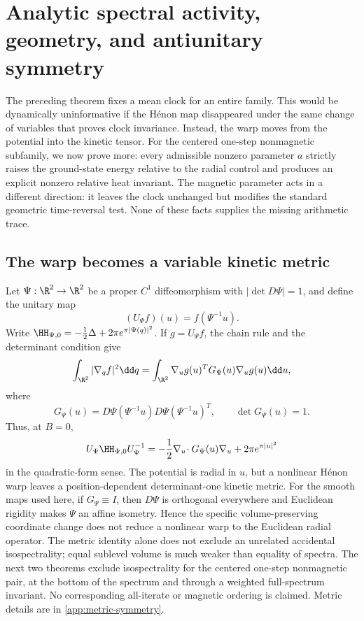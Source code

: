 \section{Analytic spectral activity, geometry, and antiunitary symmetry}
\label{sec:active}

The preceding theorem fixes a mean clock for an entire family.  This would
be dynamically uninformative if the H\'enon map disappeared under the same
change of variables that proves clock invariance.  Instead, the warp moves
from the potential into the kinetic tensor.  For the centered one-step
nonmagnetic subfamily, we now prove more: every admissible nonzero parameter
\(a\) strictly raises the ground-state energy relative to the radial control
and produces an explicit nonzero relative heat invariant.  The
magnetic parameter acts in a different direction: it leaves the clock
unchanged but modifies the standard geometric time-reversal test.  None of
these facts supplies the missing arithmetic trace.

\subsection{The warp becomes a variable kinetic metric}

Let \(\Psi:\R^2\to\R^2\) be a proper \(C^1\) diffeomorphism with
\(|\det D\Psi|=1\), and define the unitary map
\begin{equation}
 (U_\Psi f)(u)=f(\Psi^{-1}u).
 \label{eq:configuration-unitary}
\end{equation}
Write
\(\HH_{\Psi,0}=-\frac12\Delta+2\pi e^{\pi|\Psi(q)|^2}\).
If \(g=U_\Psi f\), the chain rule and the determinant condition give
\begin{equation}
 \int_{\R^2}|\nabla_q f|^2\dd q
 =\int_{\R^2}\nabla_u g(u)^T G_\Psi(u)\nabla_u g(u)\dd u,
 \label{eq:metric-form}
\end{equation}
where
\begin{equation}
 G_\Psi(u)
 =D\Psi(\Psi^{-1}u)D\Psi(\Psi^{-1}u)^T,
 \qquad \det G_\Psi(u)=1.
 \label{eq:metric-tensor}
\end{equation}
Thus, at \(B=0\),
\begin{equation}
 U_\Psi\HH_{\Psi,0}U_\Psi^{-1}
 =-\frac12\nabla_u\!\cdot G_\Psi(u)\nabla_u
  +2\pi e^{\pi|u|^2}
 \label{eq:unitary-metric}
\end{equation}
in the quadratic-form sense.  The potential is radial in \(u\), but a
nonlinear H\'enon warp leaves a position-dependent determinant-one kinetic
metric.  For the smooth maps used here, if \(G_\Psi\equiv I\), then
\(D\Psi\) is orthogonal everywhere and Euclidean rigidity makes \(\Psi\) an
affine isometry.  Hence the
specific volume-preserving coordinate change does not reduce a nonlinear
warp to the Euclidean radial operator.  The metric identity alone does not
exclude an unrelated accidental isospectrality; equal sublevel volume is
much weaker than equality of spectra.  The next two theorems exclude
isospectrality for the centered one-step nonmagnetic pair, at the bottom of
the spectrum and through a weighted full-spectrum invariant.  No
corresponding all-iterate or magnetic ordering is claimed.  Metric details
are in \cref{app:metric-symmetry}.

